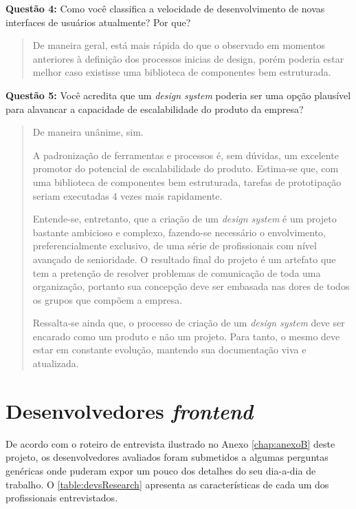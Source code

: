 \textbf{Questão 4:} Como você classifica a velocidade de desenvolvimento de novas interfaces de usuários atualmente? Por que?

\begin{quote}
    De maneira geral, está mais rápida do que o observado em momentos anteriores à definição dos processos inicias de design, porém poderia estar melhor caso existisse uma biblioteca de componentes bem estruturada.
\end{quote}

\textbf{Questão 5:} Você acredita que um \textit{design system} poderia ser uma opção plausível para alavancar a capacidade de escalabilidade do produto da empresa?

\begin{quote}
    De maneira unânime, sim.

    A padronização de ferramentas e processos é, sem dúvidas, um excelente promotor do potencial de escalabilidade do produto. Estima-se que, com uma biblioteca de componentes bem estruturada, tarefas de prototipação seriam executadas 4 vezes mais rapidamente.
    
    Entende-se, entretanto, que a criação de um \textit{design system} é um projeto bastante ambicioso e complexo, fazendo-se necessário o envolvimento, preferencialmente exclusivo, de uma série de profissionais com nível avançado de senioridade. O resultado final do projeto é um artefato que tem a pretenção de resolver problemas de comunicação de toda uma organização, portanto sua concepção deve ser embasada nas dores de todos os grupos que compõem a empresa.
    
    Ressalta-se ainda que, o processo de criação de um \textit{design system} deve ser encarado como um produto e não um projeto. Para tanto, o mesmo deve estar em constante evolução, mantendo sua documentação viva e atualizada.
\end{quote}

\section{Desenvolvedores \textit{frontend}}
\label{sec:entrevistasDevs}

De acordo com o roteiro de entrevista ilustrado no Anexo \ref{chap:anexoB} deste projeto, os desenvolvedores avaliados foram submetidos a algumas perguntas genéricas onde puderam expor um pouco dos detalhes do seu dia-a-dia de trabalho. O \autoref{table:devsResearch} apresenta as características de cada um dos profissionais entrevistados.

